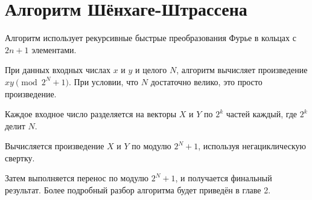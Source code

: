 \section{Алгоритм Шёнхаге-Штрассена}
Алгоритм использует рекурсивные быстрые преобразования Фурье в кольцах с $2n + 1$ элементами.

При данных входных числах $x$ и $y$ и целого $N$, алгоритм вычисляет произведение $xy \pmod{2^N + 1}$.
При условии, что $N$ достаточно велико, это просто произведение.

Каждое входное число разделяется на векторы $X$ и $Y$ по $2^k$ частей каждый, где $2^k$ делит $N$.

Вычисляется произведение $X$ и $Y$ по модулю $2^N + 1$, используя негациклическую свертку.

Затем выполняется перенос по модулю $2^N  + 1$, и получается финальный результат. Более подробный разбор алгоритма будет приведён в главе 2.

